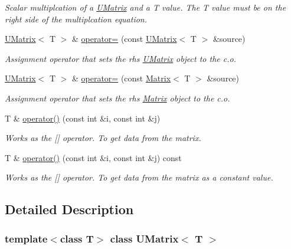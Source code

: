 \begin{DoxyCompactItemize}
\begin{DoxyCompactList}\small\item\em Scalar multiplcation of a \mbox{\hyperlink{class_u_matrix}{U\+Matrix}} and a T value. The T value must be on the right side of the multiplcation equation. \end{DoxyCompactList}\item 
\mbox{\hyperlink{class_u_matrix}{U\+Matrix}}$<$ T $>$ \& \mbox{\hyperlink{class_u_matrix_a3f12f4544a460dd93dac8a883654310f}{operator=}} (const \mbox{\hyperlink{class_u_matrix}{U\+Matrix}}$<$ T $>$ \&source)
\begin{DoxyCompactList}\small\item\em Assignment operator that sets the rhs \mbox{\hyperlink{class_u_matrix}{U\+Matrix}} object to the c.\+o. \end{DoxyCompactList}\item 
\mbox{\hyperlink{class_u_matrix}{U\+Matrix}}$<$ T $>$ \& \mbox{\hyperlink{class_u_matrix_a98d77665ae6c6dd8c264d7aca57d76fd}{operator=}} (const \mbox{\hyperlink{class_matrix}{Matrix}}$<$ T $>$ \&source)
\begin{DoxyCompactList}\small\item\em Assignment operator that sets the rhs \mbox{\hyperlink{class_matrix}{Matrix}} object to the c.\+o. \end{DoxyCompactList}\item 
T \& \mbox{\hyperlink{class_u_matrix_a06c554ab9d6deb7d1950cdd49eb089e0}{operator()}} (const int \&i, const int \&j)
\begin{DoxyCompactList}\small\item\em Works as the \mbox{[}\mbox{]} operator. To get data from the matrix. \end{DoxyCompactList}\item 
T \& \mbox{\hyperlink{class_u_matrix_a2fbb6915ab1a6bb7a8944b51600b6d2d}{operator()}} (const int \&i, const int \&j) const
\begin{DoxyCompactList}\small\item\em Works as the \mbox{[}\mbox{]} operator. To get data from the matrix as a constant value. \end{DoxyCompactList}\end{DoxyCompactItemize}


\subsection{Detailed Description}
\subsubsection*{template$<$class T$>$\newline
class U\+Matrix$<$ T $>$}

